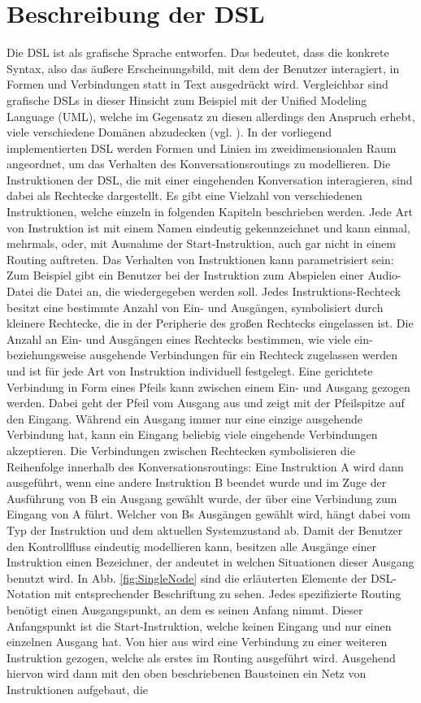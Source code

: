 \section{Beschreibung der DSL}
Die DSL ist als grafische Sprache entworfen. Das bedeutet, dass die konkrete Syntax, also das äußere Erscheinungsbild, mit dem der Benutzer interagiert, in Formen und Verbindungen statt in Text ausgedrückt wird. Vergleichbar sind grafische DSLs in dieser Hinsicht zum Beispiel mit der Unified Modeling Language (UML), welche im Gegensatz zu diesen allerdings den Anspruch erhebt, viele verschiedene Domänen abzudecken (vgl. \cite[S. 17]{Booch:05}).
\newline 
In der vorliegend implementierten DSL werden Formen und Linien im zweidimensionalen Raum angeordnet, um das Verhalten des Konversationsroutings zu modellieren. Die Instruktionen der DSL, die mit einer eingehenden Konversation interagieren, sind dabei als Rechtecke dargestellt. Es gibt eine Vielzahl von verschiedenen Instruktionen, welche einzeln in folgenden Kapiteln beschrieben werden. Jede Art von  Instruktion ist mit einem Namen eindeutig gekennzeichnet und kann einmal, mehrmals, oder, mit Ausnahme der Start-Instruktion, auch gar nicht in einem Routing auftreten. Das Verhalten von Instruktionen kann parametrisiert sein: Zum Beispiel gibt ein Benutzer bei der Instruktion zum Abspielen einer Audio-Datei die Datei an, die wiedergegeben werden soll. Jedes Instruktions-Rechteck besitzt eine bestimmte Anzahl von Ein- und Ausgängen, symbolisiert durch kleinere Recht\-ecke, die in der Peripherie des großen Rechtecks eingelassen ist. Die Anzahl an Ein- und Ausgängen eines Rechtecks bestimmen, wie viele ein- beziehungsweise ausgehende Verbindungen für ein Rechteck zugelassen werden und ist für jede Art von Instruktion individuell festgelegt. Eine gerichtete Verbindung in Form eines Pfeils kann zwischen einem Ein- und Ausgang gezogen werden. Dabei geht der Pfeil vom Ausgang aus und zeigt mit der Pfeilspitze auf den Eingang. Während ein Ausgang immer nur eine einzige ausgehende Verbindung hat, kann ein Eingang beliebig viele eingehende Verbindungen akzeptieren. Die Verbindungen zwischen Rechtecken symbolisieren die Reihenfolge innerhalb des Konversationsroutings: Eine Instruktion A wird dann ausgeführt, wenn eine andere Instruktion B beendet wurde und im Zuge der Ausführung von B ein Ausgang gewählt wurde, der über eine Verbindung zum Eingang von A führt. Welcher von Bs Ausgängen gewählt wird, hängt dabei vom Typ der Instruktion und dem aktuellen Systemzustand ab. Damit der Benutzer den Kontrollfluss eindeutig modellieren kann, besitzen alle Ausgänge einer Instruktion einen Bezeichner, der andeutet in welchen Situationen dieser Ausgang benutzt wird.  In Abb. \ref{fig:SingleNode} sind die erläuterten Elemente der DSL-Notation mit entsprechender Beschriftung zu sehen. Jedes spezifizierte Routing benötigt einen Ausgangspunkt, an dem es seinen Anfang nimmt. Dieser Anfangspunkt ist die Start-Instruktion, welche keinen Eingang und nur einen einzelnen Ausgang hat. Von hier aus wird eine Verbindung zu einer weiteren Instruktion gezogen, welche als erstes im Routing ausgeführt wird. Ausgehend hiervon wird dann mit den oben beschriebenen Bausteinen ein Netz von Instruktionen aufgebaut, die 